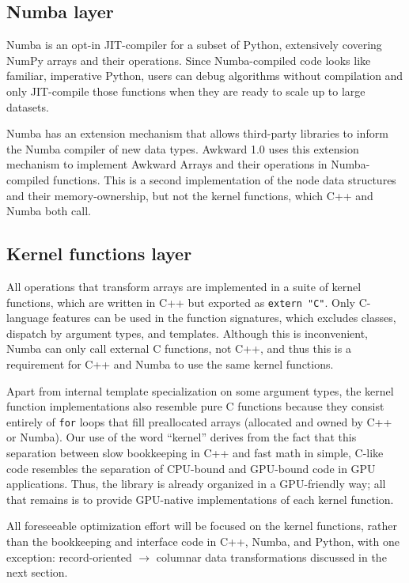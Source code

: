\documentclass{webofc}
\begin{document}
\subsection{Numba layer}

Numba is an opt-in JIT-compiler for a subset of Python, extensively covering NumPy arrays and their operations. Since Numba-compiled code looks like familiar, imperative Python, users can debug algorithms without compilation and only JIT-compile those functions when they are ready to scale up to large datasets.

Numba has an extension mechanism that allows third-party libraries to inform the Numba compiler of new data types. Awkward 1.0 uses this extension mechanism to implement Awkward Arrays and their operations in Numba-compiled functions. This is a second implementation of the node data structures and their memory-ownership, but not the kernel functions, which C++ and Numba both call.

\subsection{Kernel functions layer}

All operations that transform arrays are implemented in a suite of kernel functions, which are written in C++ but exported as \texttt{extern "C"}. Only C-language features can be used in the function signatures, which excludes classes, dispatch by argument types, and templates. Although this is inconvenient, Numba can only call external C functions, not C++, and thus this is a requirement for C++ and Numba to use the same kernel functions.

Apart from internal template specialization on some argument types, the kernel function implementations also resemble pure C functions because they consist entirely of \texttt{for} loops that fill preallocated arrays (allocated and owned by C++ or Numba). Our use of the word ``kernel'' derives from the fact that this separation between slow bookkeeping in C++ and fast math in simple, C-like code resembles the separation of CPU-bound and GPU-bound code in GPU applications. Thus, the library is already organized in a GPU-friendly way; all that remains is to provide GPU-native implementations of each kernel function.

All foreseeable optimization effort will be focused on the kernel functions, rather than the bookkeeping and interface code in C++, Numba, and Python, with one exception: record-oriented $\to$ columnar data transformations discussed in the next section.
\end{document}
